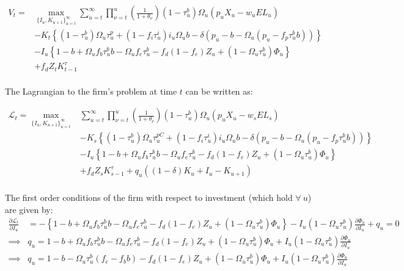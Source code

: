  \begin{equation}
\label{eqn:firm_seq_prob}
\begin{split}
V_{t} = &   \max_{\{I_{u},K_{u+1}\}^{\infty}_{u=t}}   \sum_{u=t}^{\infty} \prod_{\nu=t}^{u}\left(\frac{1}{1+\theta_{\nu}}\right) (1-\tau^{b}_{u})\Omega_{u}(p_{u}X_{u}-w_{u}EL_{u})  \\ 
 & - K_{t} \left\{(1-\tau^{b}_{u})\Omega_{u}\tau^{p}_{u}+(1-f_{i}\tau^{i}_{u})i_{u}\Omega_{u}b-\delta(p_{u}-b-\Omega_{u}(p_{u}-f_{p}\tau^{b}_{u}b))\right\}  \\
 & - I_{u}\left\{1-b+\Omega_{u}f_{b}\tau^{b}_{u}b-\Omega_{u}f_{e}\tau^{b}_{u} - f_{d}(1-f_{e})Z_{u} + (1-\Omega_{u}\tau^{b}_{u})\Phi_{u}\right\} \\
 &  + f_{d}Z_{t}K^{\tau}_{t-1} \\
\end{split}
\end{equation}

The Lagrangian to the firm's problem at time $t$ can be written as:

 \begin{equation}
\label{eqn:lagrangian}
\begin{split}
\mathcal{L}_{t} = \max_{\{I_{u},K_{u+1}\}^{\infty}_{u=t}} &  \sum_{u=t}^{\infty} \prod_{\nu=t}^{u}\left(\frac{1}{1+\theta_{\nu}}\right) (1-\tau^{b}_{u})\Omega_{u}(p_{u}X_{u}-w_{s}EL_{s})  \\ 
 & - K_{s} \left\{(1-\tau^{b}_{u})\Omega_{u}\tau^{pC}_{u}+(1-f_{i}\tau^{i}_{u})i_{u}\Omega_{u}b-\delta(p_{u}-b-\Omega_{u}(p_{u}-f_{p}\tau^{b}_{u}b))\right\}  \\
 & - I_{u}\left\{1-b+\Omega_{u}f_{b}\tau^{b}_{u}b-\Omega_{u}f_{e}\tau^{b}_{u} - f_{d}(1-f_{e})Z_{u} + (1-\Omega_{u}\tau^{b}_{u})\Phi_{u}\right\} \\
 &  + f_{d}Z_{s}K^{\tau}_{s-1} + q_{u}((1-\delta)K_{u} + I_{u}-K_{u+1})\\
\end{split}
\end{equation}

The first order conditions of the firm with respect to investment (which hold $\forall \ u$) are given by:
 \begin{equation}
\label{eqn:foc_i}
\begin{split}
\frac{\partial \mathcal{L}_{t}}{\partial I_{u}} & = -\left\{1-b+\Omega_{u}f_{b}\tau^{b}_{u}b-\Omega_{u}f_{e}\tau^{b}_{u} - f_{d}(1-f_{e})Z_{u} + (1-\Omega_{u}\tau^{b}_{u})\Phi_{u}\right\} - I_{u}(1-\Omega_{u}\tau^{b}_{u})\frac{\partial \Phi_{u}}{\partial I_{u}} + q_{u} = 0 \\
\implies & q_{u}  = 1-b+\Omega_{u}f_{b}\tau^{b}_{u}b-\Omega_{u}f_{e}\tau^{b}_{u} - f_{d}(1-f_{e})Z_{u} + (1-\Omega_{u}\tau^{b}_{u})\Phi_{u} +  I_{u}(1-\Omega_{u}\tau^{b}_{u})\frac{\partial \Phi_{u}}{\partial I_{u}} \\
\implies & q_{u}  = 1-b-\Omega_{u}\tau^{b}_{u}(f_{e}-f_{b}b) - f_{d}(1-f_{e})Z_{u} + (1-\Omega_{u}\tau^{b}_{u})\Phi_{u} +  I_{u}(1-\Omega_{u}\tau^{b}_{u})\frac{\partial \Phi_{u}}{\partial I_{u}} 
\end{split}
\end{equation}

